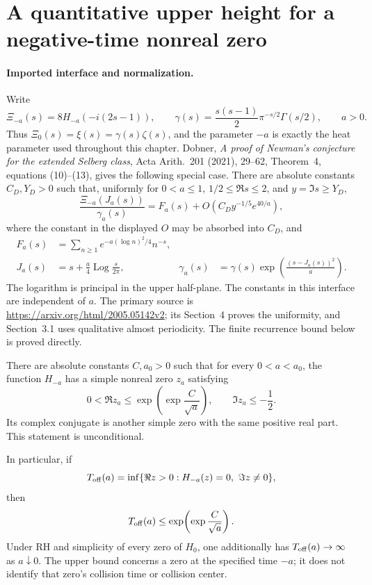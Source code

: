 \section{A quantitative upper height for a negative-time nonreal zero}

\paragraph{Imported interface and normalization.}
Write
\[
 \Xi_{-a}(s)=8H_{-a}(-i(2s-1)),\qquad
 \gamma(s)=\frac{s(s-1)}2\pi^{-s/2}\Gamma(s/2),
 \qquad a>0.
\]
Thus \(\Xi_0(s)=\xi(s)=\gamma(s)\zeta(s)\), and the
parameter \(-a\) is exactly the heat parameter used throughout this
chapter. Dobner, \emph{A proof of Newman's conjecture for the extended
Selberg class}, Acta Arith.\ 201 (2021), 29--62,
Theorem~4, equations (10)--(13), gives the following special case.
There are absolute constants \(C_D,Y_D>0\) such that, uniformly for
\(0<a\le1\), \(1/2\le\Re s\le2\), and \(y=\Im s\ge Y_D\),
\begin{equation}\label{eq:A051-Dobner}
 \frac{\Xi_{-a}(J_a(s))}{\gamma_a(s)}
   =F_a(s)+O\!\left(C_Dy^{-1/5}e^{40/a}\right),
\end{equation}
where the constant in the displayed \(O\) may be absorbed into
\(C_D\), and
\begin{align*}
 F_a(s)&=\sum_{n\ge1}e^{-a(\log n)^2/4}n^{-s},\\
 J_a(s)&=s+\frac a4\operatorname{Log}\frac{s}{2\pi},
 &\gamma_a(s)&=\gamma(s)
       \exp\!\left(\frac{(s-J_a(s))^2}{a}\right).
\end{align*}
The logarithm is principal in the upper half-plane. The constants in
this interface are independent of \(a\). The primary source is
\url{https://arxiv.org/html/2005.05142v2}; its Section~4 proves the
uniformity, and Section~3.1 uses qualitative almost periodicity.
The finite recurrence bound below is proved directly.

\begin{theorem}
\label{thm:A051-height}
There are absolute constants \(C,a_0>0\) such that for every
\(0<a<a_0\), the function \(H_{-a}\) has a simple nonreal zero \(z_a\)
satisfying
\[
 0<\Re z_a\le \exp\!\left(\exp\frac{C}{\sqrt a}\right),
 \qquad \Im z_a\le-\frac12.
\]
Its complex conjugate is another simple zero with the same positive
real part. This statement is unconditional.

In particular, if
\[
 T_{\rm off}(a)=\inf\{\Re z>0:H_{-a}(z)=0,\ \Im z\ne0\},
\]
then
\[
       T_{\rm off}(a)\le
            \exp\!\left(\exp\frac{C}{\sqrt a}\right).
\]
Under RH and simplicity of every zero of \(H_0\), one additionally has
\(T_{\rm off}(a)\to\infty\) as \(a\downarrow0\).
The upper bound concerns a zero at the specified time \(-a\);
it does not identify that zero's collision time or collision center.
\end{theorem}

